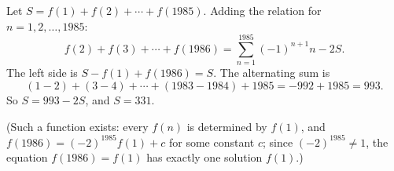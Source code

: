 Let $S=f(1)+f(2)+\cdots+f(1985)$. Adding the relation for $n=1,2,\ldots,1985$:
\[f(2)+f(3)+\cdots+f(1986)=\sum_{n=1}^{1985}(-1)^{n+1}n-2S .\]
The left side is $S-f(1)+f(1986)=S$. The alternating sum is
\[(1-2)+(3-4)+\cdots+(1983-1984)+1985=-992+1985=993 .\]
So $S=993-2S$, and $S=\boxed{331}$.

(Such a function exists: every $f(n)$ is determined by $f(1)$, and $f(1986)=(-2)^{1985}f(1)+c$ for some constant $c$; since $(-2)^{1985}\ne1$, the equation $f(1986)=f(1)$ has exactly one solution $f(1)$.)
